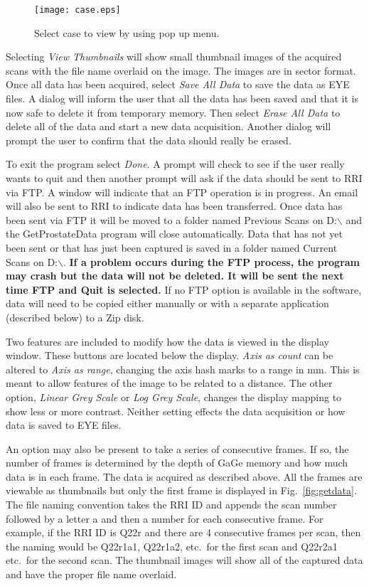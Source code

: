 \documentclass[10pt]{article}
\begin{document}
\begin{figure}[htb]
\begin{center}
\texttt{[image: case.eps]}
 \caption{Select case to view by using pop up menu.}
 \label{fig:case}
\end{center}
\end{figure}

Selecting {\it View Thumbnails} will show small thumbnail images
of the acquired scans with the file name overlaid on the image.
The images are in sector format. Once all data has been acquired,
select {\it Save All Data} to save the data as EYE files. A dialog
will inform the user that all the data has been saved and that it
is now safe to delete it from temporary memory. Then select {\it
Erase All Data} to delete all of the data and start a new data
acquisition. Another dialog will prompt the user to confirm that
the data should really be erased.

To exit the program select {\it Done}. A prompt will check to see
if the user really wants to quit and then another prompt will ask
if the data should be sent to RRI via FTP. A window will indicate
that an FTP operation is in progress. An email will also be sent
to RRI to indicate data has been transferred. Once data has been
sent via FTP it will be moved to a folder named Previous Scans on
D:$\backslash$ and the GetProstateData program will close
automatically. Data that has not yet been sent or that has just
been captured is saved in a folder named Current Scans on
D:$\backslash$. {\bf If a problem occurs during the FTP process,
the program may crash but the data will not be deleted. It will be
sent the next time FTP and Quit is selected.} If no FTP option is
available in the software, data will need to be copied either
manually or with a separate application (described below) to a Zip
disk.

Two features are included to modify how the data is viewed in the
display window. These buttons are located below the display. {\it
Axis as count} can be altered to {\it Axis as range}, changing the
axis hash marks to a range in mm. This is meant to allow features
of the image to be related to a distance. The other option, {\it
Linear Grey Scale} or {\it Log Grey Scale}, changes the display
mapping to show less or more contrast. Neither setting effects the
data acquisition or how data is saved to EYE files.

An option may also be present to take a series of consecutive
frames. If so, the number of frames is determined by the depth of
GaGe memory and how much data is in each frame. The data is
acquired as described above. All the frames are viewable as
thumbnails but only the first frame is displayed in
Fig.~\ref{fig:getdata}. The file naming convention takes the RRI
ID and appends the scan number followed by a letter a and then a
number for each consecutive frame. For example, if the RRI ID is
Q22r and there are 4 consecutive frames per scan, then the naming
would be Q22r1a1, Q22r1a2, etc.~for the first scan and Q22r2a1
etc.~for the second scan. The thumbnail images will show all of
the captured data and have the proper file name overlaid.
\end{document}
